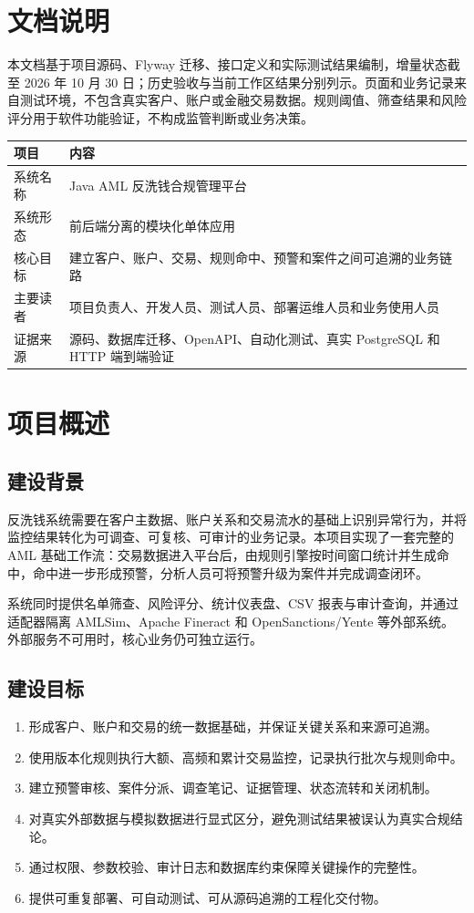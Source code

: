 \documentclass[UTF8,openany,zihao=-4]{ctexrep}
\begin{document}
\chapter*{文档说明}
本文档基于项目源码、Flyway 迁移、接口定义和实际测试结果编制，增量状态截至 2026 年 10 月 30 日；历史验收与当前工作区结果分别列示。页面和业务记录来自测试环境，不包含真实客户、账户或金融交易数据。规则阈值、筛查结果和风险评分用于软件功能验证，不构成监管判断或业务决策。

\begin{longtable}{p{}p{}}
\toprule 项目 & 内容 \\ \midrule
系统名称 & Java AML 反洗钱合规管理平台 \\
系统形态 & 前后端分离的模块化单体应用 \\
核心目标 & 建立客户、账户、交易、规则命中、预警和案件之间可追溯的业务链路 \\
主要读者 & 项目负责人、开发人员、测试人员、部署运维人员和业务使用人员 \\
证据来源 & 源码、数据库迁移、OpenAPI、自动化测试、真实 PostgreSQL 和 HTTP 端到端验证 \\
\bottomrule
\end{longtable}
\tableofcontents
\clearpage
{}

\chapter{项目概述}
\section{建设背景}
反洗钱系统需要在客户主数据、账户关系和交易流水的基础上识别异常行为，并将监控结果转化为可调查、可复核、可审计的业务记录。本项目实现了一套完整的 AML 基础工作流：交易数据进入平台后，由规则引擎按时间窗口统计并生成命中，命中进一步形成预警，分析人员可将预警升级为案件并完成调查闭环。

系统同时提供名单筛查、风险评分、统计仪表盘、CSV 报表与审计查询，并通过适配器隔离 AMLSim、Apache Fineract 和 OpenSanctions/Yente 等外部系统。外部服务不可用时，核心业务仍可独立运行。

\section{建设目标}
\begin{enumerate}
\item 形成客户、账户和交易的统一数据基础，并保证关键关系和来源可追溯。
\item 使用版本化规则执行大额、高频和累计交易监控，记录执行批次与规则命中。
\item 建立预警审核、案件分派、调查笔记、证据管理、状态流转和关闭机制。
\item 对真实外部数据与模拟数据进行显式区分，避免测试结果被误认为真实合规结论。
\item 通过权限、参数校验、审计日志和数据库约束保障关键操作的完整性。
\item 提供可重复部署、可自动测试、可从源码追溯的工程化交付物。
\end{enumerate}
\end{document}
